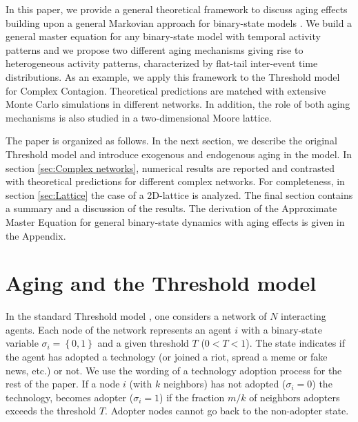 In this paper, we provide a general theoretical framework to discuss aging effects building upon a general Markovian approach for binary-state models \cite{gleeson-2011,gleeson-2013}. We build a general master equation for any binary-state model with temporal activity patterns and we propose two different aging mechanisms giving rise to heterogeneous activity patterns, characterized by flat-tail inter-event time distributions. As an example, we apply this framework to the Threshold model for Complex Contagion.
Theoretical predictions are matched with extensive Monte Carlo simulations in different networks. In addition, the role of both aging mechanisms is also studied in a two-dimensional Moore lattice. 

The paper is organized as follows. In the next section, we describe the original Threshold model and introduce exogenous and endogenous aging in the model. In section \ref{sec:Complex networks}, numerical results are reported and contrasted with theoretical predictions for different complex networks. For completeness, in section \ref{sec:Lattice} the case of a 2D-lattice is analyzed. The final section contains a summary and a discussion of the results. The derivation of the Approximate Master Equation for general binary-state dynamics with aging effects is given in the Appendix.

\section{\label{sec:Threshold model with aging} Aging and the Threshold model}

In the standard Threshold model \cite{granovetter-1978,watts-2002}, one considers a network of $N$ interacting agents. Each node of the network represents an agent $i$ with a binary-state variable $\sigma_i = \left\{ 0,1 \right\}$  and a given threshold $T$ ($0<T<1$). The state indicates if the agent has adopted a technology (or joined a riot, spread a meme or fake news, etc.) or not. We use the wording of a technology adoption process for the rest of the paper. If a node $i$ (with $k$ neighbors) has not adopted  ($\sigma_i = 0$) the technology, becomes adopter ($\sigma_i = 1$) if the fraction $m / k$ of neighbors adopters exceeds the threshold $T$. Adopter nodes cannot go back to the non-adopter state.

